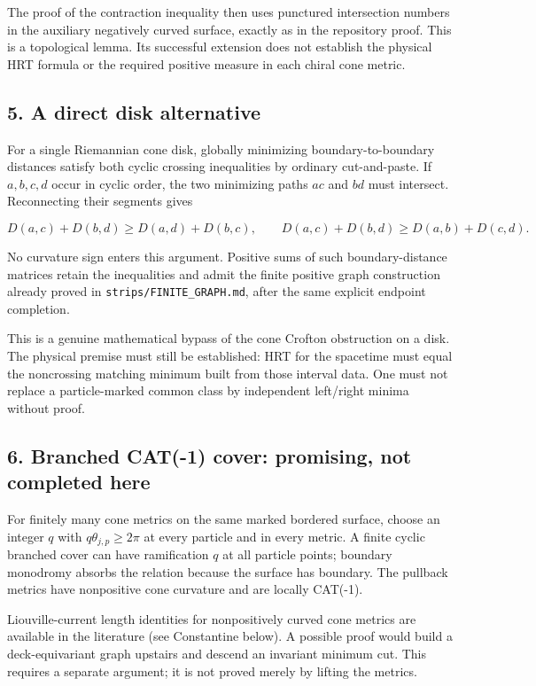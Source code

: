 \documentclass[11pt]{article}
\begin{document}
The proof of the contraction inequality then uses punctured intersection
numbers in the auxiliary negatively curved surface, exactly as in the
repository proof. This is a topological lemma. Its successful extension
does not establish the physical HRT formula or the required positive
measure in each chiral cone metric.

\subsection{5. A direct disk
alternative}\label{a-direct-disk-alternative}

For a single Riemannian cone disk, globally minimizing
boundary-to-boundary distances satisfy both cyclic crossing inequalities
by ordinary cut-and-paste. If \(a,b,c,d\) occur in cyclic order, the two
minimizing paths \(a\!c\) and \(b\!d\) must intersect. Reconnecting
their segments gives

\[
D(a,c)+D(b,d)\ge D(a,d)+D(b,c),
\qquad
D(a,c)+D(b,d)\ge D(a,b)+D(c,d).
\]

No curvature sign enters this argument. Positive sums of such
boundary-distance matrices retain the inequalities and admit the finite
positive graph construction already proved in
\texttt{strips/FINITE\_\allowbreak GRAPH.md}, after the same explicit endpoint
completion.

This is a genuine mathematical bypass of the cone Crofton obstruction on
a disk. The physical premise must still be established: HRT for the
spacetime must equal the noncrossing matching minimum built from those
interval data. One must not replace a particle-marked common class by
independent left/right minima without proof.

\subsection{6. Branched CAT(-1) cover: promising, not completed
here}\label{branched-cat-1-cover-promising-not-completed-here}

For finitely many cone metrics on the same marked bordered surface,
choose an integer \(q\) with \(q\theta_{j,p}\ge2\pi\) at every particle
and in every metric. A finite cyclic branched cover can have
ramification \(q\) at all particle points; boundary monodromy absorbs
the relation because the surface has boundary. The pullback metrics have
nonpositive cone curvature and are locally CAT(-1).

Liouville-current length identities for nonpositively curved cone
metrics are available in the literature (see Constantine below). A
possible proof would build a deck-equivariant graph upstairs and descend
an invariant minimum cut. This requires a separate argument; it is not
proved merely by lifting the metrics.
\end{document}
